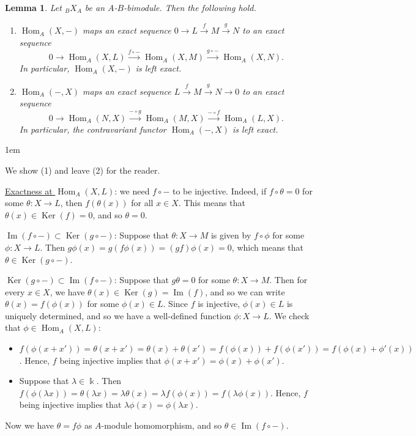 \documentclass[11pt,a4paper]{article}
\makeatletter
\numberwithin{equation}{section}
\renewenvironment{proof}[1][\proofname]{\par
    \pushQED{\qed}%
    \normalfont \topsep0\p@\@plus6\p@ \labelsep1em\relax
    \trivlist
    \item[\hskip\labelsep\indent
        \bfseries #1]\ignorespaces
    \mbox{}
}{
    \popQED\endtrivlist\@endpefalse
}
\theoremstyle{all}
\newtheorem{lemma}[theorem]{Lemma}
\theoremstyle{remark}
\newcommand{\Hom}{\operatorname{Hom}\nolimits}
\renewcommand{\Im}{\operatorname{Im}\nolimits}
\newcommand{\Ker}{\operatorname{Ker}\nolimits}
\makeatother
\begin{document}
\begin{lemma}
Let ${}_BX_A$ be an $A$-$B$-bimodule.  Then the following hold.

\begin{enumerate}
\item $\Hom_A(X,-)$ maps an exact sequence $0\to L\xrightarrow{f}M\xrightarrow{g} N$ to an exact sequence 
\[
0\to \Hom_A(X,L)\xrightarrow{f\circ-} \Hom_A(X,M) \xrightarrow{g\circ-} \Hom_A(X,N).
\]
In particular, $\Hom_A(X,-)$ is left exact.

\item $\Hom_A(-,X)$ maps an exact sequence $L\xrightarrow{f}M\xrightarrow{g} N\to 0$ to an exact sequence
\[
0\to \Hom_A(N,X)\xrightarrow{-\circ g} \Hom_A(M,X) \xrightarrow{-\circ f} \Hom_A(L,X).
\]
In particular, the contravariant functor $\Hom_A(-,X)$ is left exact.
\end{enumerate}
\end{lemma}
\begin{proof}
We show (1) and leave (2) for the reader.

\underline{Exactness at $\Hom_A(X,L)$}:  we need $f\circ-$ to be injective.  Indeed, if $f\circ \theta=0$ for some $\theta:X\to L$, then $f(\theta(x))$ for all $x\in X$.  This means that $\theta(x)\in \Ker(f)=0$, and so $\theta=0$.

\underline{$\Im(f\circ-)\subset \Ker(g\circ-)$}:  Suppose that $\theta:X\to M$ is given by $f\circ \phi$ for some $\phi:X\to L$.  Then $g\phi(x)=g(f\phi(x))=(gf)\phi(x)=0$, which means that $\theta\in\Ker(g\circ -)$.

\underline{$\Ker(g\circ-)\subset \Im(f\circ-)$}:  Suppose that $g\theta=0$ for some $\theta:X\to M$.  Then for every $x\in X$, we have $\theta(x)\in \Ker(g)=\Im(f)$, and so we can write $\theta(x)=f(\phi(x))$ for some $\phi(x)\in L$.
Since $f$ is injective, $\phi(x)\in L$ is uniquely determined, and so we have a well-defined function $\phi:X\to L$.
We check that $\phi\in\Hom_A(X,L)$:
\begin{itemize}
\item $f(\phi(x+x'))=\theta(x+x')=\theta(x)+\theta(x')=f(\phi(x))+f(\phi(x'))=f(\phi(x)+\phi'(x))$.  Hence, $f$ being injective implies that $\phi(x+x')=\phi(x)+\phi(x')$.

\item Suppose that $\lambda\in\Bbbk$.  Then $f(\phi(\lambda x))=\theta(\lambda x)=\lambda\theta(x)=\lambda f(\phi(x))=f(\lambda \phi(x))$.  Hence, $f$ being injective implies that $\lambda\phi(x)=\phi(\lambda x)$.
\end{itemize}
Now we have $\theta=f\phi$ as $A$-module homomorphism, and so $\theta\in\Im(f\circ-)$.
\end{proof}
\end{document}
